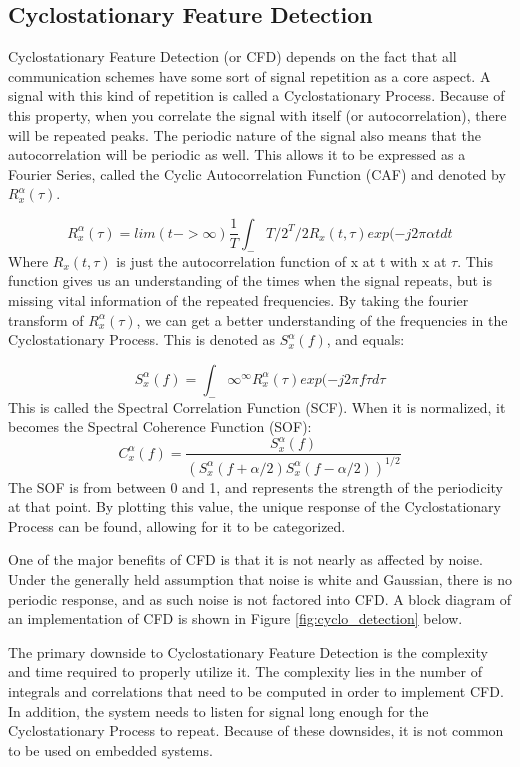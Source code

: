 \subsection{Cyclostationary Feature Detection}
Cyclostationary Feature Detection (or CFD) depends on the fact that all communication schemes have some sort of signal repetition as a core aspect. A signal with this kind of repetition is called a Cyclostationary Process\cite{cyclostat_journal}. Because of this property, when you correlate the signal with itself (or autocorrelation), there will be repeated peaks. The periodic nature of the signal also means that the autocorrelation will be periodic as well. This allows it to be expressed as a Fourier Series, called the Cyclic Autocorrelation Function (CAF) and denoted by $R_x^\alpha(\tau)$.\par 
\[R_x^\alpha(\tau)=lim(t->\infty) \frac{1}{T} \int_-T/2^T/2 R_x(t,\tau)exp(-j2\pi\alpha t dt\]
Where $R_x(t,\tau)$ is just the autocorrelation function of x at t with x at $\tau$. This function gives us an understanding of the times when the signal repeats, but is missing vital information of the repeated frequencies. By taking the fourier transform of $R_x^\alpha(\tau)$, we can get a better understanding of the frequencies in the Cyclostationary Process. This is denoted as $S_x^\alpha(f)$, and equals: \par
\[ S_x^\alpha(f)=\int_-\infty^\infty R_x^\alpha(\tau)exp(-j2\pi f\tau d\tau \]
This is called the Spectral Correlation Function (SCF). When it is normalized, it becomes the Spectral Coherence Function (SOF):
\[C_x^\alpha(f) = \frac{ S_x^\alpha(f)}{ (S_x^\alpha(f+\alpha/2) S_x^\alpha(f-\alpha/2))^{1/2}} \]
The SOF is from between 0 and 1, and represents the strength of the periodicity at that point. By plotting this value, the unique response of the Cyclostationary Process can be found, allowing for it to be categorized. \par
One of the major benefits of CFD is that it is not nearly as affected by noise. Under the generally held assumption that noise is white and Gaussian, there is no periodic response, and as such noise is not factored into CFD. A block diagram of an implementation of CFD is shown in Figure \ref{fig:cyclo_detection} below. \par

The primary downside to Cyclostationary Feature Detection is the complexity and time required to properly utilize it. The complexity lies in the number of integrals and correlations that need to be computed in order to implement CFD. In addition, the system needs to listen for signal long enough for the Cyclostationary Process to repeat. Because of these downsides, it is not common to be used on embedded systems. \par


